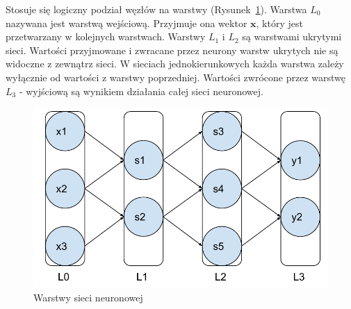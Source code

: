 \documentclass[a4paper,12pt,twoside,openany]{report}
\newcommand{\Rys}[1]{(Rysunek~\ref{#1})}
\renewcommand{\vec}[1]{\bm{#1}}
\begin{document}
Stosuje się logiczny podział węzłów na warstwy \Rys{rys:mlp:warstwy}.
Warstwa $L_0$ nazywana jest warstwą wejściową.
Przyjmuje ona wektor $\vec x$, który jest przetwarzany w kolejnych warstwach.
Warstwy $L_1$ i $L_2$ są warstwami ukrytymi sieci. 
Wartości przyjmowane i zwracane przez neurony warstw ukrytych nie są widoczne z zewnątrz sieci.
W sieciach jednokierunkowych każda warstwa zależy wyłącznie od wartości z warstwy poprzedniej.
Wartości zwrócone przez warstwę $L_3$ - wyjściową są wynikiem działania całej sieci neuronowej.
\begin{figure}[h]
	\centering
	\includegraphics[width=\textwidth]{ann-warstwy}
	\caption{Warstwy sieci neuronowej}
	\label{rys:mlp:warstwy}
\end{figure}
\end{document}
